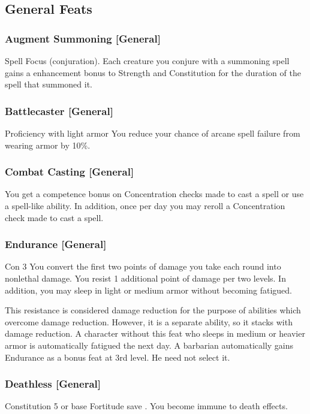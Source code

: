 \subsection{General Feats}

\subsubsection{Augment Summoning [General]}
 Spell Focus (conjuration).
 Each creature you conjure with a summoning spell gains a  enhancement bonus to Strength and Constitution for the duration of the spell that summoned it.

\subsubsection{Battlecaster [General]}
\featpre Proficiency with light armor
\featben You reduce your chance of arcane spell failure from wearing armor by 10\%. 


\subsubsection{Combat Casting [General]}
 You get a  competence bonus on Concentration checks made to cast a spell or use a spell-like ability. In addition, once per day you may reroll a Concentration check made to cast a spell.

\subsubsection{Endurance [General]}
\featpre Con 3
 You convert the first two points of damage you take each round into nonlethal damage. You resist 1 additional point of damage per two levels. In addition, you may sleep in light or medium armor without becoming fatigued.

This resistance is considered damage reduction for the purpose of abilities which overcome damage reduction. However, it is a separate ability, so it stacks with damage reduction.
 A character without this feat who sleeps in medium or heavier armor is automatically fatigued the next day.
 A barbarian automatically gains Endurance as a bonus feat at 3rd level. He need not select it.

\subsubsection{Deathless [General]}
\featpre Constitution 5 or base Fortitude save .
\featben You become immune to death effects.

